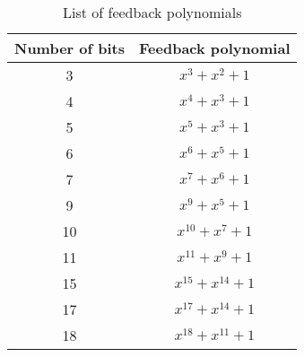 \begin{table}[!h]
	\centering
	\caption{List of feedback polynomials}
	\label{tbl:polynomial}
	\begin{tabular} {|c |c |}
	\hline
	\textbf{Number of bits} & \textbf{Feedback polynomial} \\ \hline
		3    & ${x^3} + {x^2} + 1$ \\ \hline
		4    & ${x^4} + {x^3} + 1$ \\ \hline
		5    & ${x^5} + {x^3} + 1$ \\ \hline
		6    & ${x^6} + {x^5} + 1$ \\ \hline
		7    & ${x^7} + {x^6} + 1$ \\ \hline
		9    & ${x^9} + {x^5} + 1$ \\ \hline
		10   & ${x^{10}} + {x^7} + 1$ \\ \hline
		11   & ${x^{11}} + {x^9} + 1$ \\ \hline
		15   & ${x^{15}} + {x^{14}} + 1$ \\ \hline
		17   & ${x^{17}} + {x^{14}} + 1$ \\ \hline
		18   & ${x^{18}} + {x^{11}} + 1$ \\ \hline
\end{tabular}
\end{table}

